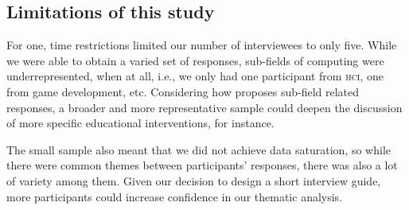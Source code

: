 \subsection{Limitations of this study}
For one, time restrictions limited our number of interviewees to only five. While we were able to obtain a varied set of responses, sub-fields of computing were underrepresented, when at all, i.e., we only had one participant from \textsc{hci}, one from game development, etc. Considering how \cite{easterbrook2010climate} proposes sub-field related responses, a broader and more representative sample could deepen the discussion of more specific educational interventions, for instance.

The small sample also meant that we did not achieve data saturation, so while there were common themes between participants' responses, there was also a lot of variety among them. Given our decision to design a short interview guide, more participants could increase confidence in our thematic analysis.


